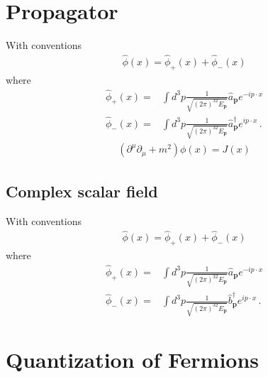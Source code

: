 \section{Propagator}
With conventions
\begin{align}
  \widehat{\phi}(x)=\widehat{\phi}_+(x)+\widehat{\phi}_-(x)
\end{align}
where
\begin{align}
  \widehat{\phi}_+(x)=&\int d^3p \frac{1}{\sqrt{(2\pi)^32E_\mathbf{p} }}
  \widehat{a}_\mathbf{p} e^{-i p\cdot x }\nonumber\\
  \widehat{\phi}_-(x)=&\int d^3p \frac{1}{\sqrt{(2\pi)^32E_\mathbf{p} }}\widehat{a}_\mathbf{p}^\dagger e^{i p\cdot x }\,.
\end{align}
\begin{align*}
  \left( \partial^{\mu}\partial_{\mu}+m^2 \right)\phi(x)=J(x)
\end{align*}

\subsection{Complex scalar field}
\begin{frame}
With conventions
\begin{align}
  \widehat{\phi}(x)=\widehat{\phi}_+(x)+\widehat{\phi}_-(x)
\end{align}
where
\begin{align}
  \widehat{\phi}_+(x)=&\int d^3p \frac{1}{\sqrt{(2\pi)^32E_\mathbf{p} }}
  \widehat{a}_\mathbf{p} e^{-i p\cdot x }\nonumber\\
  \widehat{\phi}_-(x)=&\int d^3p \frac{1}{\sqrt{(2\pi)^32E_\mathbf{p} }}\widehat{b}_\mathbf{p}^\dagger e^{i p\cdot x }\,.
\end{align}
\end{frame}


\section{Quantization of Fermions}
\label{sec:quant-ferm}

